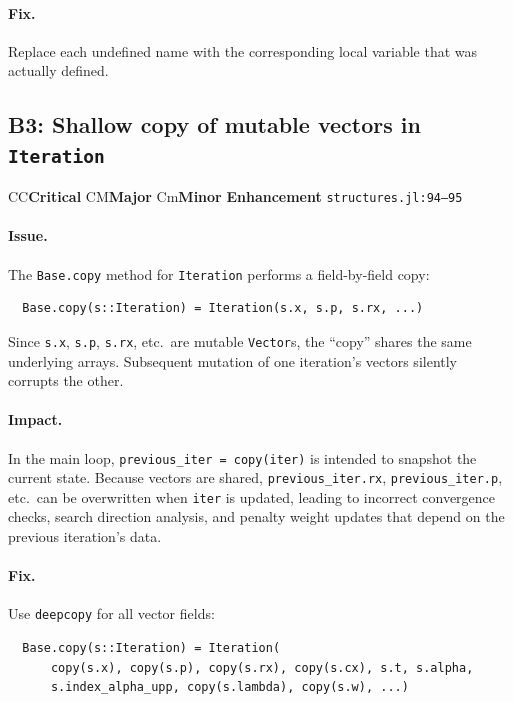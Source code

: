 \documentclass[11pt, a4paper]{article}
\newcommand{\juliaref}[2]{\texttt{#1:#2}}
\newcommand{\severity}[1]{%
  \ifx#1C\colorbox{red!20}{\textbf{Critical}}%
  \else\ifx#1M\colorbox{orange!20}{\textbf{Major}}%
  \else\ifx#1m\colorbox{yellow!20}{\textbf{Minor}}%
  \else\colorbox{blue!10}{\textbf{Enhancement}}%
  \fi\fi\fi%
}
\begin{document}
\paragraph{Fix.}
Replace each undefined name with the corresponding local variable that
was actually defined.

\subsection{B3: Shallow copy of mutable vectors in \texttt{Iteration}}
\label{sec:b3}

\severity{C} \quad \juliaref{structures.jl}{94--95}

\paragraph{Issue.}
The \texttt{Base.copy} method for \texttt{Iteration} performs a
field-by-field copy:
\begin{lstlisting}
  Base.copy(s::Iteration) = Iteration(s.x, s.p, s.rx, ...)
\end{lstlisting}
Since \texttt{s.x}, \texttt{s.p}, \texttt{s.rx}, etc.\ are mutable
\texttt{Vector}s, the ``copy'' shares the same underlying arrays.
Subsequent mutation of one iteration's vectors silently corrupts the
other.

\paragraph{Impact.}
In the main loop, \texttt{previous\_iter = copy(iter)} is intended to
snapshot the current state.  Because vectors are shared,
\texttt{previous\_iter.rx}, \texttt{previous\_iter.p}, etc.\ can be
overwritten when \texttt{iter} is updated, leading to incorrect
convergence checks, search direction analysis, and penalty weight
updates that depend on the previous iteration's data.

\paragraph{Fix.}
Use \texttt{deepcopy} for all vector fields:
\begin{lstlisting}
  Base.copy(s::Iteration) = Iteration(
      copy(s.x), copy(s.p), copy(s.rx), copy(s.cx), s.t, s.alpha,
      s.index_alpha_upp, copy(s.lambda), copy(s.w), ...)
\end{lstlisting}
\end{document}
